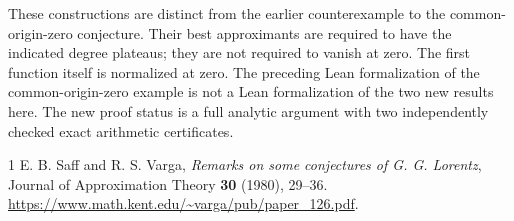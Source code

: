 \documentclass[11pt]{article}
\theoremstyle{remark}\newtheorem{remark}[theorem]{Remark}
\begin{document}
These constructions are distinct from the earlier counterexample to the
common-origin-zero conjecture. Their best approximants are required to
have the indicated degree plateaus; they are not required to vanish at
zero. The first function itself is normalized at zero. The preceding
Lean formalization of the common-origin-zero example is not a Lean
formalization of the two new results here. The new proof status is a full
analytic argument with two independently checked exact arithmetic
certificates.

\begin{thebibliography}{1}
E. B. Saff and R. S. Varga,
\emph{Remarks on some conjectures of G. G. Lorentz},
Journal of Approximation Theory \textbf{30} (1980), 29--36.
\url{https://www.math.kent.edu/~varga/pub/paper_126.pdf}.
\end{thebibliography}
\end{document}
